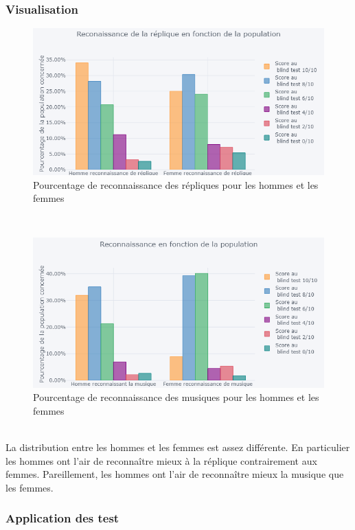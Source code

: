 \documentclass{article} %
\begin{document}
\subsubsection{Visualisation}
\begin{figure}[!hbt]
	\centering
	\includegraphics[keepaspectratio,scale=0.9]{h21.png}
	\caption{ Pourcentage de reconnaissance des répliques pour les hommes et les femmes}
\end{figure}~\\
\begin{figure}[!hbt]
	\centering
	\includegraphics[keepaspectratio,scale=0.9]{h22.png}
	\caption{ Pourcentage de reconnaissance des musiques pour les hommes et les femmes}
\end{figure}~\\
La distribution entre les hommes et les femmes est assez différente. En particulier les hommes ont l'air de reconnaître mieux à la réplique contrairement aux femmes. Pareillement, les hommes ont l'air de reconnaître mieux la musique que les femmes.
\subsubsection{ Application des test}
\end{document}
